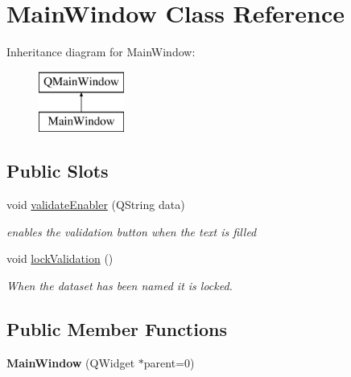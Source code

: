 \hypertarget{class_main_window}{}\section{Main\+Window Class Reference}
\label{class_main_window}
Inheritance diagram for Main\+Window\+:\begin{figure}[H]
\begin{center}
\leavevmode
\includegraphics[height=2.000000cm]{class_main_window}
\end{center}
\end{figure}
\subsection*{Public Slots}
\begin{DoxyCompactItemize}
\item 
void \hyperlink{class_main_window_ab231326d40a58616a2a6c194a95f40af}{validate\+Enabler} (Q\+String data)
\begin{DoxyCompactList}\small\item\em enables the validation button when the text is filled \end{DoxyCompactList}\item 
void \hyperlink{class_main_window_afc77791f1b130480a0c9364a999283d7}{lock\+Validation} ()\hypertarget{class_main_window_afc77791f1b130480a0c9364a999283d7}{}\label{class_main_window_afc77791f1b130480a0c9364a999283d7}

\begin{DoxyCompactList}\small\item\em When the dataset has been named it is locked. \end{DoxyCompactList}\end{DoxyCompactItemize}
\subsection*{Public Member Functions}
\begin{DoxyCompactItemize}
\item 
{\bfseries Main\+Window} (Q\+Widget $\ast$parent=0)\hypertarget{class_main_window_a8b244be8b7b7db1b08de2a2acb9409db}{}\label{class_main_window_a8b244be8b7b7db1b08de2a2acb9409db}

\end{DoxyCompactItemize}


